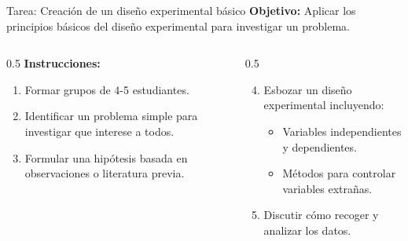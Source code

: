 ﻿\documentclass{beamer}
\begin{document}
\begin{frame}{Tarea: Creación de un diseño experimental básico}
    \textbf{Objetivo:} Aplicar los principios básicos del diseño experimental para investigar un problema.\\[10pt]
    
    \begin{columns}[T]
        \begin{column}{0.5\textwidth}
            \textbf{Instrucciones:}
            \begin{enumerate}
                \item Formar grupos de 4-5 estudiantes.
                \item Identificar un problema simple para investigar que interese a todos.
                \item Formular una hipótesis basada en observaciones o literatura previa.
            \end{enumerate}
        \end{column}
        \begin{column}{0.5\textwidth}
            \begin{enumerate}
                \setcounter{enumi}{3}
                \item Esbozar un diseño experimental incluyendo:
                \begin{itemize}
                    \item Variables independientes y dependientes.
                    \item Métodos para controlar variables extrañas.
                \end{itemize}
                \item Discutir cómo recoger y analizar los datos.
            \end{enumerate}
        \end{column}
    \end{columns}
    
\end{frame}
\end{document}
